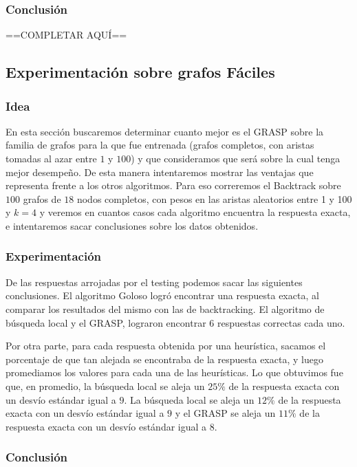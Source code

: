 \subsubsection{Conclusión}

==COMPLETAR AQUÍ==

\subsection{Experimentación sobre grafos Fáciles}

\subsubsection{Idea}

En esta sección buscaremos determinar cuanto mejor es el GRASP sobre la familia de grafos para la que fue entrenada (grafos completos, con aristas tomadas al azar entre $1$ y $100$) y que consideramos que será sobre la cual tenga mejor desempeño. De esta manera intentaremos mostrar las ventajas que representa frente a los otros algoritmos. Para eso correremos el Backtrack sobre $100$ grafos de $18$ nodos completos, con pesos en las aristas aleatorios entre 1 y 100 y $k = 4$ y veremos en cuantos casos cada algoritmo encuentra la respuesta exacta, e intentaremos sacar conclusiones sobre los datos obtenidos.

\subsubsection{Experimentación}

De las respuestas arrojadas por el testing podemos sacar las siguientes conclusiones. El algoritmo Goloso logró encontrar una respuesta exacta, al comparar los resultados del mismo con las de backtracking. El algoritmo de búsqueda local y el GRASP, lograron encontrar 6 respuestas correctas cada uno.

Por otra parte, para cada respuesta obtenida por una heurística, sacamos el porcentaje de que tan alejada se encontraba de la respuesta exacta, y luego promediamos los valores para cada una de las heurísticas. Lo que obtuvimos fue que, en promedio, la búsqueda local se aleja un $25 \%$ de la respuesta exacta con un desvío estándar igual a $9$. La búsqueda local se aleja un $12 \%$ de la respuesta exacta con un desvío estándar igual a $9$ y el GRASP se aleja un $11 \%$ de la respuesta exacta con un desvío estándar igual a $8$.

\subsubsection{Conclusión}

